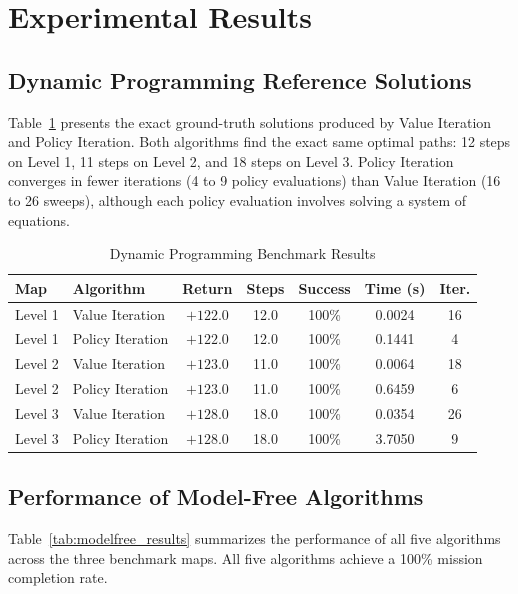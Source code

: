 \documentclass[10pt,conference]{IEEEtran}
\begin{document}
\section{Experimental Results}

\subsection{Dynamic Programming Reference Solutions}
Table~\ref{tab:dp_results} presents the exact ground-truth solutions produced by Value Iteration and Policy Iteration. Both algorithms find the exact same optimal paths: 12 steps on Level 1, 11 steps on Level 2, and 18 steps on Level 3. Policy Iteration converges in fewer iterations (4 to 9 policy evaluations) than Value Iteration (16 to 26 sweeps), although each policy evaluation involves solving a system of equations.

\begin{table}[htbp]
\caption{Dynamic Programming Benchmark Results}
\label{tab:dp_results}
\centering
\begin{tabular}{llccccc}
\toprule
\textbf{Map} & \textbf{Algorithm} & \textbf{Return} & \textbf{Steps} & \textbf{Success} & \textbf{Time (s)} & \textbf{Iter.} \\
\midrule
Level 1 & Value Iteration  & $+122.0$ & 12.0 & 100\% & 0.0024 & 16 \\
Level 1 & Policy Iteration & $+122.0$ & 12.0 & 100\% & 0.1441 & 4  \\
\midrule
Level 2 & Value Iteration  & $+123.0$ & 11.0 & 100\% & 0.0064 & 18 \\
Level 2 & Policy Iteration & $+123.0$ & 11.0 & 100\% & 0.6459 & 6  \\
\midrule
Level 3 & Value Iteration  & $+128.0$ & 18.0 & 100\% & 0.0354 & 26 \\
Level 3 & Policy Iteration & $+128.0$ & 18.0 & 100\% & 3.7050 & 9  \\
\bottomrule
\end{tabular}
\end{table}

\subsection{Performance of Model-Free Algorithms}
Table~\ref{tab:modelfree_results} summarizes the performance of all five algorithms across the three benchmark maps. All five algorithms achieve a 100\% mission completion rate.
\end{document}

